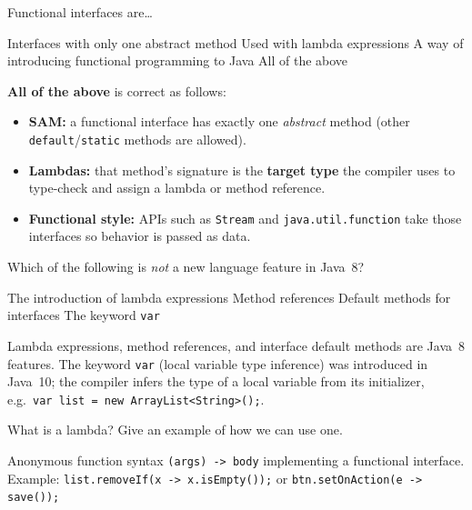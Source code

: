 \question[4]
Functional interfaces are\ldots
\begin{choices}
  \choice Interfaces with only one abstract method
  \choice Used with lambda expressions
  \choice A way of introducing functional programming to Java
  \CorrectChoice All of the above
\end{choices}
\begin{solution}
  \textbf{All of the above} is correct as follows:
  \begin{itemize}
    \item \textbf{SAM:} a functional interface has exactly one \emph{abstract} method (other \texttt{default}/\texttt{static} methods are allowed).
    \item \textbf{Lambdas:} that method's signature is the \textbf{target type} the compiler uses to type-check and assign a lambda or method reference.
    \item \textbf{Functional style:} APIs such as \texttt{Stream} and \texttt{java.util.function} take those interfaces so behavior is passed as data.
  \end{itemize}
\end{solution}














\newpage
{}

\question[4]
Which of the following is \emph{not} a new language feature in Java~8?
\begin{choices}
  \choice The introduction of lambda expressions
  \choice Method references
  \choice Default methods for interfaces
  \CorrectChoice The keyword \lstinline!var!
\end{choices}
\begin{solution}
  Lambda expressions, method references, and interface default methods are Java~8 features. The keyword \lstinline!var! (local variable type inference) was introduced in Java~10; the compiler infers the type of a local variable from its initializer, e.g.\ \lstinline!var list = new ArrayList<String>();!.
\end{solution}

\question[4]
What is a lambda? Give an example of how we can use one.
\begin{solutionorbox}[1.45in]
  Anonymous function syntax \texttt{(args) -> body} implementing a functional interface. Example: \texttt{list.removeIf(x -> x.isEmpty());} or \texttt{btn.setOnAction(e -> save());}
\end{solutionorbox}

